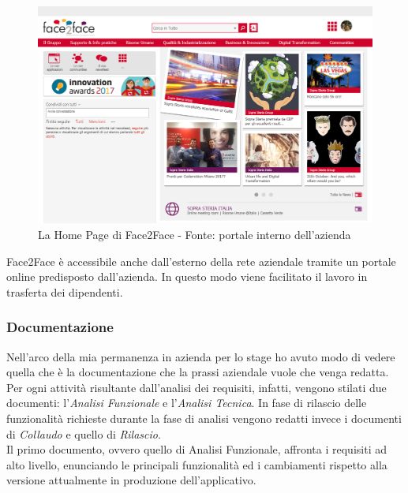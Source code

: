 	\begin{figure}[H]
		\centering
	   	\includegraphics[width=1\textwidth]{immagini/Face2Face}
	   	\caption{La Home Page di Face2Face - Fonte: portale interno dell'azienda}
	\end{figure}
		
	Face2Face è accessibile anche dall'esterno della rete aziendale tramite un portale online predisposto dall'azienda. In questo modo viene facilitato il lavoro in trasferta dei dipendenti.\\
	
	\subsubsection{Documentazione}
	
	Nell'arco della mia permanenza in azienda per lo stage ho avuto modo di vedere quella che è la documentazione che la prassi aziendale vuole che venga redatta. Per ogni attività risultante dall'analisi dei requisiti, infatti, vengono stilati due documenti: l'\textit{Analisi Funzionale} e l'\textit{Analisi Tecnica}. In fase di rilascio delle funzionalità richieste durante la fase di analisi vengono redatti invece i documenti di \textit{Collaudo} e quello di \textit{Rilascio}.\\
	
	Il primo documento, ovvero quello di Analisi Funzionale, affronta i requisiti ad alto livello, enunciando le principali funzionalità ed i cambiamenti rispetto alla versione attualmente in produzione dell'applicativo.\\
	
